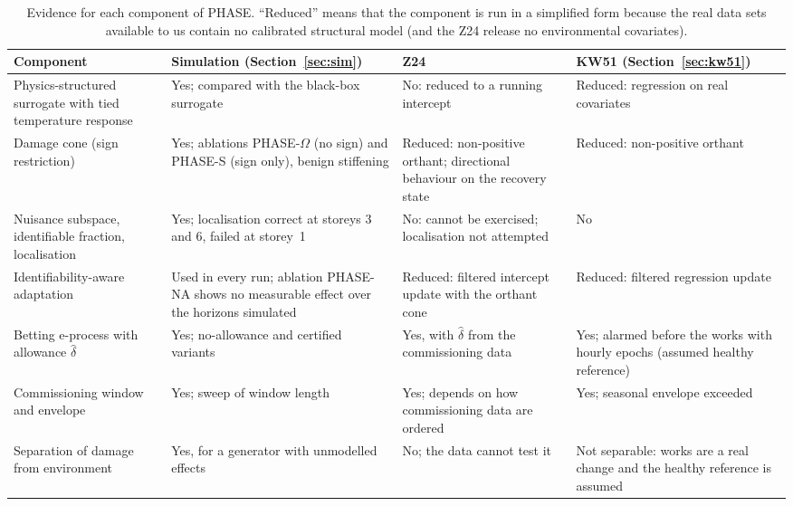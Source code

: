 \documentclass[12pt,a4paper]{article}
\newenvironment{revblock}{}{}
\newenvironment{revblock}{\begingroup\color{revcol}}{\endgroup}
\newcommand{\rtwo}[1]{#1}
\newcommand{\rtwo}[1]{{\color{revcolb}#1}}
\begin{document}
\begin{revblock}
\begin{table}[t]
\centering
\small
\caption{Evidence for each component of PHASE. ``Reduced'' means that the component is run in a simplified form because the real data sets available to us contain no calibrated structural model (and the Z24 release no environmental covariates).}
\label{tab:components}
\begin{tabular}{p{3.4cm}p{3.9cm}p{3.7cm}p{3.7cm}}
\toprule
Component & Simulation (Section~\ref{sec:sim}) & Z24 & KW51 (Section~\ref{sec:kw51}) \\
\midrule
Physics-structured surrogate with tied temperature response & Yes; compared with the black-box surrogate & No: reduced to a running intercept & Reduced: regression on real covariates \\
Damage cone (sign restriction) & Yes; ablations PHASE-$\Omega$ (no sign) and PHASE-S (sign only), benign stiffening & Reduced: non-positive orthant; directional behaviour on the recovery state & Reduced: non-positive orthant \\
Nuisance subspace, identifiable fraction, localisation & Yes; localisation correct at storeys 3 and 6, failed at storey~1 & No: cannot be exercised; localisation not attempted & No \\
Identifiability-aware adaptation & Used in every run; ablation PHASE-NA shows no measurable effect over the horizons simulated & Reduced: filtered intercept update with the orthant cone & Reduced: filtered regression update \\
Betting e-process with allowance $\hat\delta$ & Yes; no-allowance and certified variants & Yes, with $\hat\delta$ from the commissioning data & \rtwo{Yes; alarmed before the works with hourly epochs (assumed healthy reference)}  \\
Commissioning window and envelope & Yes; sweep of window length & Yes; depends on how commissioning data are ordered & Yes; seasonal envelope exceeded \\
Separation of damage from environment & Yes, for a generator with unmodelled effects & No; the data cannot test it & Not separable: works are a real change and the healthy reference is assumed \\
\bottomrule
\end{tabular}
\end{table}
\end{revblock}
\end{document}
